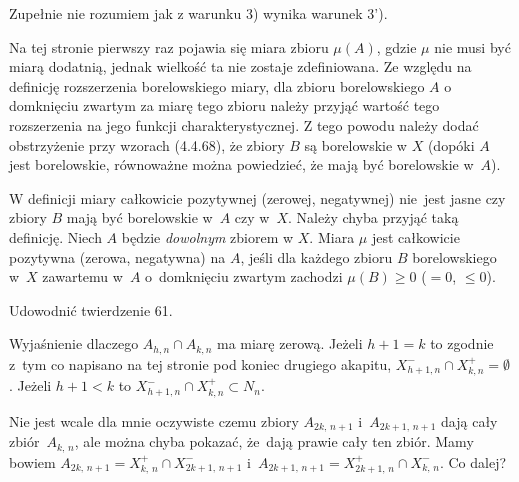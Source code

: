 \documentclass[a4paper,11pt]{article}
\numberwithin{equation}{section}
\begin{document}
\vspace{\spaceFour}



\start {} Zupełnie nie rozumiem jak z warunku 3) wynika warunek
3').

\vspace{\spaceFour}



\start {} Na tej stronie pierwszy raz pojawia się miara zbioru
$\mu( A )$, gdzie $\mu$ nie musi być miarą dodatnią, jednak wielkość
ta nie zostaje zdefiniowana. Ze względu na definicję rozszerzenia
borelowskiego miary, dla zbioru borelowskiego $A$ o domknięciu zwartym
za miarę tego zbioru należy przyjąć wartość tego rozszerzenia na jego
funkcji charakterystycznej. Z tego powodu należy dodać obstrzyżenie
przy wzorach (4.4.68), że zbiory $B$ są borelowskie w $X$ (dopóki $A$
jest borelowskie, równoważne można powiedzieć, że mają być borelowskie
w~$A$).

\vspace{\spaceFour}



\start {} W definicji miary całkowicie pozytywnej (zerowej,
negatywnej) nie~jest jasne czy zbiory $B$ mają być borelowskie w~$A$
czy w~$X$. Należy chyba przyjąć taką definicję. Niech $A$ będzie
\textit{dowolnym} zbiorem w $X$. Miara $\mu$ jest całkowicie pozytywna
(zerowa, negatywna) na $A$, jeśli dla każdego zbioru $B$ borelowskiego
w~$X$ zawartemu w~$A$ o~domknięciu zwartym zachodzi $\mu( B ) \geq 0$
($= 0$, $\leq 0$).

\vspace{\spaceFour}



\start {} Udowodnić twierdzenie 61.

\vspace{\spaceFour}



\start {} Wyjaśnienie dlaczego $A_{ h, n } \cap A_{ k, n }$ ma
miarę zerową. Jeżeli $h + 1 = k$ to zgodnie z~tym co napisano na tej
stronie pod koniec drugiego akapitu,
$X^{ - }_{ h + 1, n } \cap X^{ + }_{ k, n } = \emptyset$. Jeżeli
$h + 1 < k$ to $X^{ - }_{ h + 1, n } \cap X^{ + }_{ k, n } \subset N_{ n }$.

\start {} Nie jest wcale dla mnie oczywiste czemu zbiory
$A_{ 2 k,\, n+ 1 }$ i~$A_{ 2 k + 1,\, n+ 1 }$ dają cały
zbiór~$A_{ k,\, n }$, ale można chyba pokazać, że~dają prawie cały ten
zbiór. Mamy bowiem
$A_{ 2 k,\, n + 1 } = X^{ + }_{ k,\, n }
\cap X^{ - }_{ 2 k + 1,\, n + 1 }$
i~$A_{ 2 k + 1,\, n + 1 } = X^{ + }_{ 2 k + 1,\, n }
\cap X^{ - }_{ k,\, n }$. Co dalej?
\end{document}
